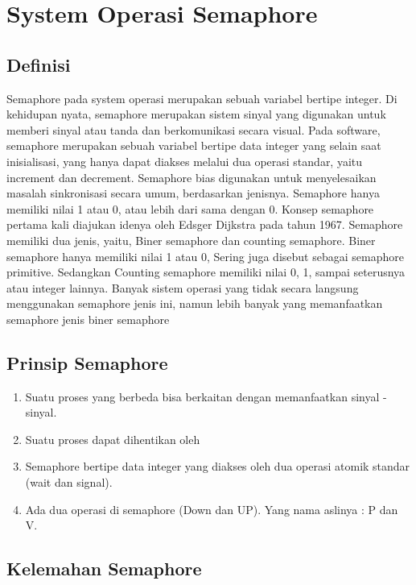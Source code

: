\section{System Operasi Semaphore}
\subsection{Definisi}
Semaphore pada system operasi merupakan sebuah variabel bertipe integer. Di kehidupan nyata, semaphore merupakan sistem sinyal 		yang digunakan untuk memberi sinyal atau tanda dan berkomunikasi secara visual. Pada software, semaphore merupakan sebuah variabel bertipe data integer yang selain saat inisialisasi, yang hanya dapat diakses melalui dua operasi standar, yaitu increment dan decrement.
Semaphore bias digunakan untuk menyelesaikan masalah sinkronisasi secara umum, berdasarkan jenisnya. Semaphore hanya memiliki nilai 1 atau 0, atau lebih dari sama dengan 0. Konsep semaphore pertama kali diajukan idenya oleh Edsger Dijkstra pada tahun 1967. Semaphore memiliki dua jenis, yaitu, Biner semaphore dan counting semaphore. Biner semaphore hanya memiliki nilai 1 atau 0, Sering juga disebut sebagai semaphore primitive. Sedangkan Counting semaphore memiliki nilai 0, 1, sampai seterusnya atau integer lainnya. Banyak sistem operasi yang tidak secara langsung menggunakan semaphore jenis ini, namun lebih banyak yang memanfaatkan semaphore jenis biner semaphore
	
	\subsection{Prinsip Semaphore}
		\begin{enumerate}

			\item Suatu proses yang berbeda bisa berkaitan dengan memanfaatkan sinyal - sinyal.
			\item Suatu proses dapat dihentikan oleh 
			\item Semaphore bertipe data integer yang diakses oleh dua operasi atomik standar (wait dan signal).
			\item Ada dua operasi di semaphore (Down dan UP). Yang nama aslinya : P dan V.
			
		\end{enumerate}
		
	\subsection{Kelemahan Semaphore}

